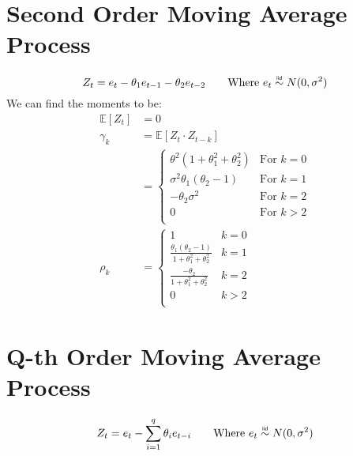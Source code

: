 \section{Second Order Moving Average Process}
\begin{equation*}
    Z_t = e_t - \theta_1 e_{t-1} - \theta_2 e_{t-2} \qquad \text{Where $e_t \iid N(0, \sigma^2)$}
\end{equation*}
We can find the moments to be:
\begin{equation*}
    \begin{aligned}
       \mathbb{E}[Z_t] & = 0 \\
       \gamma_k &= \mathbb{E}[Z_t \cdot Z_{t-k}] \\
           &= \begin{cases}
               \theta^2 (1 + \theta_1^2 + \theta_2^2) & \text{For $k=0$} \\
                   \sigma^2\theta_1(\theta_2 - 1) & \text{For $k=1$} \\
                   -\theta_2\sigma^2 & \text{For $k=2$} \\
                   0  & \text{For $k>2$} \\
           \end{cases} \\
        \rho_k &= \begin{cases}
            1  \quad &k= 0 \\
            \frac{\theta_1(\theta_2 - 1)}{1 + \theta_1^2 + \theta_2^2} & k=1 \\
            \frac{-\theta_2}{1 + \theta_1^2 + \theta^2_2} & k=2 \\
            0 & k>2 \\
            \end{cases}
    \end{aligned}
\end{equation*}

\section{Q-th Order Moving Average Process}
\begin{equation*}
    Z_t = e_t - \sum_{i=1}^{q} \theta_i e_{t-i} \qquad \text{Where $e_t \iid
    N(0, \sigma^2)$}
\end{equation*}

